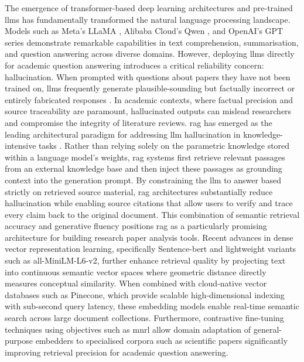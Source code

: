 \newline \newline The emergence of transformer-based deep learning architectures \citep{vaswani2017attention} and pre-trained \gls{llm}s has fundamentally transformed the natural language processing landscape. Models such as Meta's LLaMA \citep{touvron2023llama}, Alibaba Cloud's Qwen \citep{yang2024qwen2}, and OpenAI's GPT series demonstrate remarkable capabilities in text comprehension, summarisation, and question answering across diverse domains. However, deploying \gls{llm}s directly for academic question answering introduces a critical reliability concern: hallucination. When prompted with questions about papers they have not been trained on, \gls{llm}s frequently generate plausible-sounding but factually incorrect or entirely fabricated responses \citep{ji2023survey}. In academic contexts, where factual precision and source traceability are paramount, hallucinated outputs can mislead researchers and compromise the integrity of literature reviews.
\newline \newline \gls{rag} has emerged as the leading architectural paradigm for addressing \gls{llm} hallucination in knowledge-intensive tasks \citep{lewis2020retrieval}. Rather than relying solely on the parametric knowledge stored within a language model's weights, \gls{rag} systems first retrieve relevant passages from an external knowledge base and then inject these passages as grounding context into the generation prompt. By constraining the \gls{llm} to answer based strictly on retrieved source material, \gls{rag} architectures substantially reduce hallucination while enabling source citations that allow users to verify and trace every claim back to the original document. This combination of semantic retrieval accuracy and generative fluency positions \gls{rag} as a particularly promising architecture for building research paper analysis tools.
\newline \newline Recent advances in dense vector representation learning, specifically Sentence-\gls{bert} \citep{reimers2019sentence} and lightweight variants such as all-MiniLM-L6-v2, further enhance retrieval quality by projecting text into continuous semantic vector spaces where geometric distance directly measures conceptual similarity. When combined with cloud-native vector databases such as Pinecone, which provide scalable high-dimensional indexing with sub-second query latency, these embedding models enable real-time semantic search across large document collections. Furthermore, contrastive fine-tuning techniques using objectives such as \gls{mnrl} \citep{henderson2017efficient} allow domain adaptation of general-purpose embedders to specialised corpora such as scientific papers significantly improving retrieval precision for academic question answering.

